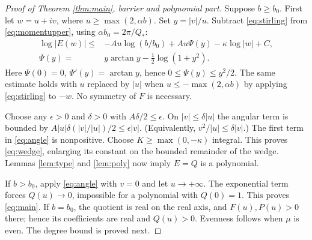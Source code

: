 \documentclass[11pt]{article}
\theoremstyle{definition}\newtheorem{definition}[theorem]{Definition}
\theoremstyle{remark}\newtheorem{remark}[theorem]{Remark}
\begin{document}
\begin{proof}[Proof of Theorem \ref{thm:main}, barrier and polynomial part]
Suppose $b\ge b_0$. First let $w=u+iv$, where $u\ge\max(2,\alpha b)$. Set $y=|v|/u$. Subtract \eqref{eq:stirling} from \eqref{eq:momentupper}, using $\alpha b_0=2\pi/Q_*$:
\begin{align}
 \log|E(w)|\le{}&-A u\log(b/b_0)+ A u\Psi(y)-\kappa\log|w|+C,\label{eq:angle}\\
 \Psi(y)={}&y\arctan y-\tfrac12\log(1+y^2).
\end{align}
Here $\Psi(0)=0$, $\Psi'(y)=\arctan y$, hence $0\le\Psi(y)\le y^2/2$. The same estimate holds with $u$ replaced by $|u|$ when $u\le-\max(2,\alpha b)$ by applying \eqref{eq:stirling} to $-w$. No symmetry of $F$ is necessary.

Choose any $\epsilon>0$ and $\delta>0$ with $A\delta/2\le\epsilon$. On $|v|\le\delta|u|$ the angular term is bounded by $A|u|\delta (|v|/|u|)/2\le\epsilon|v|$. (Equivalently, $v^2/|u|\le\delta|v|$.) The first term in \eqref{eq:angle} is nonpositive. Choose $K\ge\max(0,-\kappa)$ integral. This proves \eqref{eq:wedge}, enlarging its constant on the bounded remainder of the wedge. Lemmas \ref{lem:type} and \ref{lem:poly} now imply $E=Q$ is a polynomial.

If $b>b_0$, apply \eqref{eq:angle} with $v=0$ and let $u\to+\infty$. The exponential term forces $Q(u)\to0$, impossible for a polynomial with $Q(0)=1$. This proves \eqref{eq:main}. If $b=b_0$, the quotient is real on the real axis, and $F(u),P(u)>0$ there; hence its coefficients are real and $Q(u)>0$. Evenness follows when $\mu$ is even. The degree bound is proved next.
\end{proof}
\end{document}
